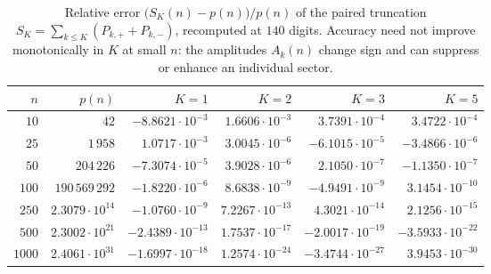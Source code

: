 \documentclass[11pt,a4paper,oneside]{book}
\theoremstyle{plain}
\theoremstyle{definition}
\theoremstyle{remark}
\begin{document}
\begin{table}[htbp]
\centering
\caption{Relative error $\bigl(S_{K}(n)-p(n)\bigr)/p(n)$ of the paired truncation
$S_{K}=\sum_{k\le K}(P_{k,+}+P_{k,-})$, recomputed at $140$ digits.  Accuracy need not
improve monotonically in $K$ at small $n$: the amplitudes $A_{k}(n)$ change sign and can
suppress or enhance an individual sector.}
\label{p3:tab:forward}
\small
\begin{tabular}{@{}rrrrrr@{}}
\toprule
$n$ & $p(n)$ & $K=1$ & $K=2$ & $K=3$ & $K=5$\\
\midrule
$10$ & $42$ & $-8.8621\cdot10^{-3}$ & $1.6606\cdot10^{-3}$ & $3.7391\cdot10^{-4}$ & $3.4722\cdot10^{-4}$\\
$25$ & $1\,958$ & $1.0717\cdot10^{-3}$ & $3.0045\cdot10^{-6}$ & $-6.1015\cdot10^{-5}$ & $-3.4866\cdot10^{-6}$\\
$50$ & $204\,226$ & $-7.3074\cdot10^{-5}$ & $3.9028\cdot10^{-6}$ & $2.1050\cdot10^{-7}$ & $-1.1350\cdot10^{-7}$\\
$100$ & $190\,569\,292$ & $-1.8220\cdot10^{-6}$ & $8.6838\cdot10^{-9}$ & $-4.9491\cdot10^{-9}$ & $3.1454\cdot10^{-10}$\\
$250$ & $2.3079\cdot10^{14}$ & $-1.0760\cdot10^{-9}$ & $7.2267\cdot10^{-13}$ & $4.3021\cdot10^{-14}$ & $2.1256\cdot10^{-15}$\\
$500$ & $2.3002\cdot10^{21}$ & $-2.4389\cdot10^{-13}$ & $1.7537\cdot10^{-17}$ & $-2.0017\cdot10^{-19}$ & $-3.5933\cdot10^{-22}$\\
$1000$ & $2.4061\cdot10^{31}$ & $-1.6997\cdot10^{-18}$ & $1.2574\cdot10^{-24}$ & $-3.4744\cdot10^{-27}$ & $3.9453\cdot10^{-30}$\\
\bottomrule
\end{tabular}
\end{table}
\end{document}
